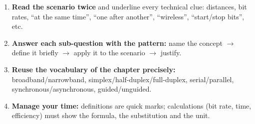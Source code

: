 \documentclass[11pt]{article}
\begin{document}
\begin{methode}
\begin{enumerate}
\item \textbf{Read the scenario twice} and underline every technical clue: distances, bit rates, ``at the same time'', ``one after another'', ``wireless'', ``start/stop bits'', etc.
\item \textbf{Answer each sub-question with the pattern:} name the concept $\rightarrow$ define it briefly $\rightarrow$ apply it to the scenario $\rightarrow$ justify.
\item \textbf{Reuse the vocabulary of the chapter precisely:} broadband/narrowband, simplex/half-duplex/full-duplex, serial/parallel, synchronous/asynchronous, guided/unguided.
\item \textbf{Manage your time:} definitions are quick marks; calculations (bit rate, time, efficiency) must show the formula, the substitution and the unit.
\end{enumerate}
\end{methode}
\end{document}
